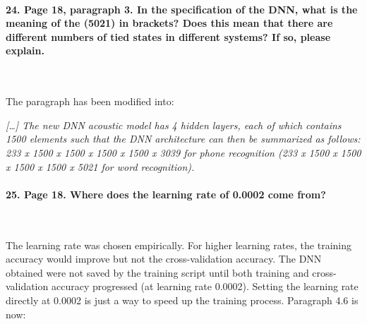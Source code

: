 \documentclass[]{article}
\begin{document}
\paragraph{24. Page 18, paragraph 3. In the specification of the DNN, what is the meaning of the (5021) in brackets? Does this mean that there are different numbers of tied states in different systems? If so, please explain.}

~

The paragraph has been modified into:

\textit{[\dots] The new DNN acoustic model  has 4 hidden layers,
each of  which contains 1500  elements such that the  DNN architecture
can then be summarized  as follows: 233 x 1500 x 1500  x 1500 x 1500 x
3039 for phone recognition (233 x 1500 x 1500  x 1500 x 1500 x 5021 for word recognition).}

\paragraph{25. Page 18. Where does the learning rate of 0.0002 come from?}

~

The learning rate was chosen empirically. For higher learning rates, the training accuracy would improve but not the cross-validation accuracy. The DNN obtained were not saved by the training script until both training and cross-validation accuracy progressed (at learning rate 0.0002). Setting the learning rate directly at 0.0002 is just a way to speed up the training process. Paragraph 4.6 is now:
\end{document}
